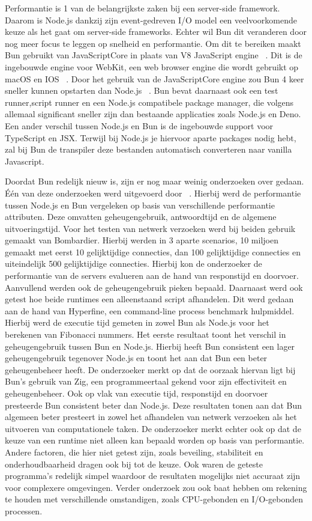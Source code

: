 Performantie is 1 van de belangrijkste zaken bij een server-side framework. Daarom is Node.js dankzij zijn 
event-gedreven I/O model een veelvoorkomende keuze als het gaat om server-side frameworks. 
Echter wil Bun dit veranderen door nog meer focus te leggen op snelheid en performantie. 
Om dit te bereiken maakt Bun gebruikt van JavaScriptCore in plaats van V8 JavaScript engine ~\autocite{McDonnel2023}.
Dit is de ingebouwde engine voor WebKit, een web browser engine die wordt gebruikt op macOS en IOS ~\autocite{Pizlo2020}.
Door het gebruik van de JavaScriptCore engine zou Bun 4 keer sneller kunnen opstarten dan Node.js ~\autocite{McDonnel2023}.
Bun bevat daarnaast ook een test runner,script runner en een Node.js compatibele package manager, die volgens ~\textcite{McDonnel2023} 
allemaal significant sneller zijn dan bestaande applicaties zoals Node.js en Deno.
Een ander verschil tussen Node.js en Bun is de ingebouwde support voor TypeScript en JSX. 
Terwijl bij Node.js je hiervoor aparte packages nodig hebt, 
zal bij Bun de transpiler deze bestanden automatisch converteren naar vanilla Javascript.

Doordat Bun redelijk nieuw is, zijn er nog maar weinig onderzoeken over gedaan.
Één van deze onderzoeken werd uitgevoerd door ~\textcite{Feroj2023}.
Hierbij werd de performantie tussen Node.js en Bun vergeleken op basis van verschillende performantie attributen. 
Deze omvatten geheugengebruik, antwoordtijd en de algemene uitvoeringstijd. 
Voor het testen van netwerk verzoeken werd bij beiden gebruik gemaakt van Bombardier. Hierbij werden in 3 aparte scenarios, 
10 miljoen gemaakt met eerst 10 gelijktijdige connecties, dan 100 gelijktijdige connecties en
uiteindelijk 500 gelijktijdige connecties. Hierbij kon de onderzoeker de performantie van de servers evalueren 
aan de hand van responstijd en doorvoer. Aanvullend werden ook de geheugengebruik pieken bepaald.
Daarnaast werd ook getest hoe beide runtimes een alleenstaand script afhandelen. 
Dit werd gedaan aan de hand van Hyperfine, een command-line process benchmark hulpmiddel. 
Hierbij werd de executie tijd gemeten in zowel Bun als Node.js voor het berekenen van Fibonacci nummers.
Het eerste resultaat toont het verschil in geheugengebruik tussen Bun en Node.js. 
Hierbij heeft Bun consistent een lager geheugengebruik tegenover Node.js en toont het aan dat Bun een beter geheugenbeheer heeft.
De onderzoeker merkt op dat de oorzaak hiervan ligt bij Bun's gebruik van Zig, 
een programmeertaal gekend voor zijn effectiviteit en geheugenbeheer. 
Ook op vlak van executie tijd, responstijd en doorvoer presteerde Bun consistent beter dan Node.js. 
Deze resultaten tonen aan dat Bun algemeen beter presteert in zowel het afhandelen van netwerk verzoeken 
als het uitvoeren van computationele taken.
De onderzoeker merkt echter ook op dat de keuze van een runtime niet alleen kan bepaald worden op basis van performantie. 
Andere factoren, die hier niet getest zijn, zoals beveiling, stabiliteit en onderhoudbaarheid dragen ook bij tot de keuze. 
Ook waren de geteste programma's redelijk simpel waardoor de resultaten mogelijks niet accuraat zijn voor complexere omgevingen.
Verder onderzoek zou ook baat hebben om rekening te houden met verschillende omstandigen, 
zoals CPU-gebonden en I/O-gebonden processen.

